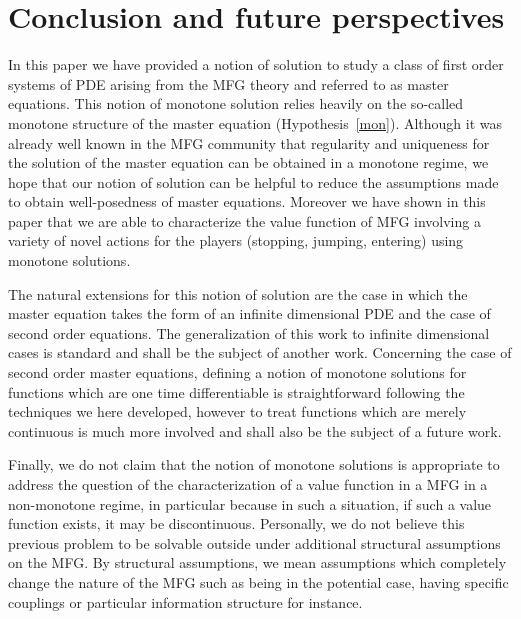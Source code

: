 \documentclass[JEP,XML,SOM,Unicode,NoEqCountersInSection,published]{cedram}
\theoremstyle{definition}
\begin{document}
\section{Conclusion and future perspectives}\label{sec:6}
In this paper we have provided a notion of solution to study a class of first order systems of PDE arising from the MFG theory and referred to as master equations. This notion of monotone solution relies heavily on the so-called monotone structure of the master equation (Hypothesis~\ref{mon}). Although it was already well known in the MFG community that regularity and uniqueness for the solution of the master equation can be obtained in a monotone regime, we hope that our notion of solution can be helpful to reduce the assumptions made to obtain well-posedness of master equations. Moreover we have shown in this paper that we are able to characterize the value function of MFG involving a variety of novel actions for the players (stopping, jumping, entering) using monotone solutions.

The natural extensions for this notion of solution are the case in which the master equation takes the form of an infinite dimensional PDE and the case of second order equations. The generalization of this work to infinite dimensional cases is standard and shall be the subject of another work. Concerning the case of second order master equations, defining a notion of monotone solutions for functions which are one time differentiable is straightforward following the techniques we here developed, however to treat functions which are merely continuous is much more involved and shall also be the subject of a future work.

Finally, we do not claim that the notion of monotone solutions is appropriate to address the question of the characterization of a value function in a MFG in a non-monotone regime, in particular because in such a situation, if such a value function exists, it may be discontinuous. Personally, we do not believe this previous problem to be solvable outside under additional structural assumptions on the MFG. By structural assumptions, we mean assumptions which completely change the nature of the MFG such as being in the potential case, having specific couplings or particular information structure for instance.

\appendix
\end{document}
